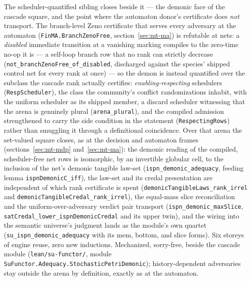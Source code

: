 The scheduler-quantified sibling closes beside it --- the demonic
face of the cascade square, and the point where the automaton
donor's certificate does \emph{not} transport.  The branch-level
Zeno certificate that serves every adversary at the automaton
(\texttt{FinMA.BranchZenoFree}, section~\ref{sec:mt-ma}) is
refutable at nets: a \emph{disabled} immediate transition at a
vanishing marking compiles to the zero-time no-op it is --- a
self-loop branch row that no rank can strictly decrease
(\texttt{not\_branchZenoFree\_of\_disabled}, discharged against the
species' shipped control net for every rank at once) --- so the
demon is instead quantified over the subclass the cascade rank
actually certifies: \emph{enabling-respecting} schedulers
(\texttt{RespScheduler}), the class the community's conflict
randomizations inhabit, with the uniform scheduler as its shipped
member, a discard scheduler witnessing that the arena is genuinely
plural (\texttt{arena\_plural}), and the compiled admission
strengthened to carry the side condition in the statement
(\texttt{RespectingRows}) rather than smuggling it through a
definitional coincidence.  Over that arena the set-valued square
closes, as at the decision and automaton frames
(sections~\ref{sec:mt-mdp} and~\ref{sec:mt-ma}): the demonic
reading of the compiled, scheduler-free net rows is isomorphic, by
an invertible globular cell, to the inclusion of the net's demonic
tangible law-set (\texttt{ispn\_demonic\_adequacy}, feeding lemma
\texttt{ispnDemonicC\_iff}), the law-set and its credal presentation
are independent of which rank certificate is spent
(\texttt{demonicTangibleLaws\_rank\_irrel} and
\texttt{demonicTangibleCredal\_rank\_irrel}), the equal-mass slice
reconciliation and the uniform-over-adversary verdict pair transport
(\texttt{ispn\_demonic\_maxSlice},
\texttt{satCredal\_lower\_ispnDemonicCredal} and its upper twin),
and the wiring into the semantic universe's judgment lands as the
module's own quartet (\texttt{su\_ispn\_demonic\_adequacy} with
its mem, bottom, and slice forms).  Six storeys of engine reuse,
zero new inductions.  Mechanized, sorry-free, beside the cascade
module (\texttt{lean/su-functor/}, module
\texttt{SuFunctor.Adequacy.StochasticPetriDemonic}); history-dependent
adversaries stay outside the arena by definition, exactly as at the
automaton.

